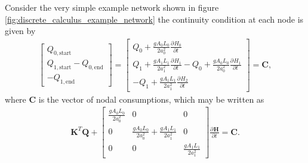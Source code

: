 \documentclass[12pt]{article}
\newcommand{\pardiv}[3]{\frac{\partial^{#1} #2}{\partial #3^{#1}}}
\begin{document}
Consider the very simple example network shown in figure \ref{fig:discrete_calculus_example_network} the continuity condition at each node is given by 
\begin{align*}
\begin{bmatrix}
Q_{0,\text{start}} \\ Q_{1,\text{start}} - Q_{0,\text{end}} \\ -Q_{1,\text{end}}
\end{bmatrix} = \begin{bmatrix}
Q_0 + \frac{gA_0 L_0}{2 a_0^2} \pardiv{}{H_0}{t} \\
Q_1 + \frac{gA_1 L_1}{2 a_1^2} \pardiv{}{H_1}{t} - Q_0 + \frac{gA_0 L_0}{2 a_0^2} \pardiv{}{H_1}{t} \\
-Q_1 + \frac{gA_1 L_1}{2 a_1^2} \pardiv{}{H_2}{t}
\end{bmatrix} = \mathbf{C},
\end{align*}
where $\mathbf{C}$ is the vector of nodal consumptions, which may be written as
\begin{align*}
\mathbf{K}^T \mathbf{Q} + \begin{bmatrix}
\frac{gA_0 L_0}{2 a_0^2} & 0 & 0 \\
0 & \frac{gA_0 L_0}{2 a_0^2} + \frac{gA_1 L_1}{2 a_1^2} & 0 \\
0 & 0 & \frac{gA_1 L_1}{2 a_1^2}
\end{bmatrix}
\pardiv{}{\mathbf{H}}{t} = \mathbf{C}.
\end{align*}
\end{document}

